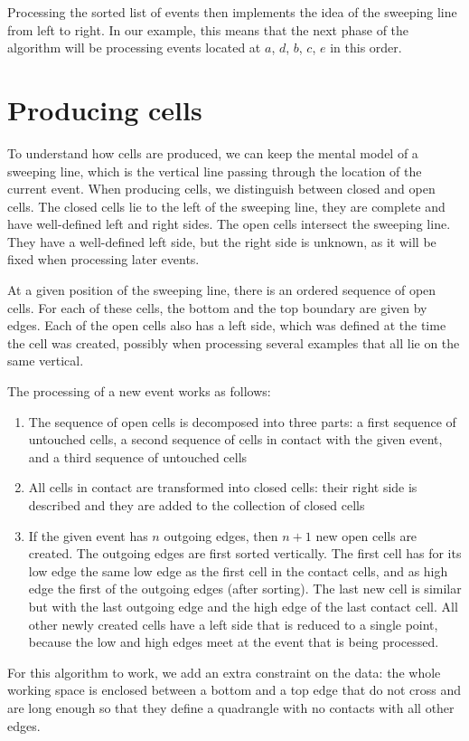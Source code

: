 \documentclass{easychair}
\begin{document}
Processing the sorted list of events then implements the idea of the
sweeping line from left to right.  In our example, this means that the
next phase of the algorithm will be processing events located at
\(a\), \(d\), \(b\), \(c\), \(e\) in this order.

\section{Producing cells}
To understand how cells are produced, we can keep the mental model of a
sweeping line, which is the vertical line passing through the location 
of the current event.
When producing cells, we distinguish between closed and open cells.
The closed cells lie to the left of the sweeping line, they are
complete and have well-defined left and right sides.  The open cells
intersect the sweeping line.  They have a well-defined left side,
but the right side is unknown, as it will be fixed when
processing later events.

At a given position of the sweeping line, there is an ordered sequence
of open cells.  For each of these cells, the bottom and the top
boundary are given by edges.  Each of the open cells also has a
left side, which was defined at the time the cell was created,
possibly when processing several examples that all lie on the same
vertical.

The processing of a new event works as follows:
\begin{enumerate}
\item The sequence of open cells is decomposed into three parts:
a first sequence of untouched cells, a second sequence of cells in
contact with the given event, and a third sequence of
untouched cells
\item All cells in contact are transformed into closed cells:
their right side is
  described and they are added to the collection of closed cells
\item If the given event has \(n\) outgoing edges, then \(n+1\) new
  open cells are created.  The outgoing edges are first sorted vertically.
  The first cell has for its low edge the
  same low edge as the first cell in the contact cells, and
  as high edge the first of the outgoing edges (after sorting).  The
  last new cell is similar but with the last outgoing edge and the
  high edge of the last contact cell.  All other newly created cells have a
  left side that is reduced to a single point, because the low and
  high edges meet at the event that is being processed.
\end{enumerate}
For this algorithm to work, we add an extra constraint on the data:
the whole working space is enclosed between a bottom and a top edge that
do not cross and
 are long enough so that they define a quadrangle with no contacts
with all other edges.
\end{document}
